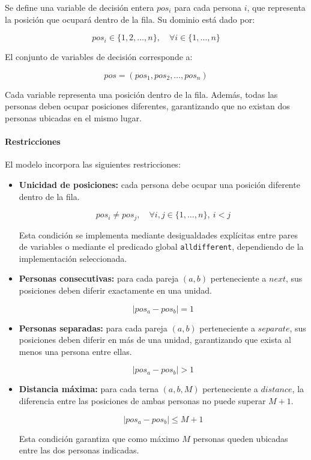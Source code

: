 Se define una variable de decisión entera $pos_i$ para cada persona $i$, que representa la posición que ocupará dentro de la fila. Su dominio está dado por:

\[
pos_i \in \{1,2,\ldots,n\},
\quad \forall i \in \{1,\ldots,n\}
\]

El conjunto de variables de decisión corresponde a:

\[
pos = (pos_1,pos_2,\ldots,pos_n)
\]

Cada variable representa una posición dentro de la fila. Además, todas las personas deben ocupar posiciones diferentes, garantizando que no existan dos personas ubicadas en el mismo lugar.

\paragraph{Restricciones}

El modelo incorpora las siguientes restricciones:

\begin{itemize}
    \item \textbf{Unicidad de posiciones:} cada persona debe ocupar una posición diferente dentro de la fila.

    \[
    pos_i \neq pos_j,
    \quad \forall i,j \in \{1,\ldots,n\},\ i<j
    \]

    Esta condición se implementa mediante desigualdades explícitas entre pares de variables o mediante el predicado global \texttt{alldifferent}, dependiendo de la implementación seleccionada.

    \item \textbf{Personas consecutivas:} para cada pareja $(a,b)$ perteneciente a $next$, sus posiciones deben diferir exactamente en una unidad.

    \[
    |pos_a-pos_b|=1
    \]

    \item \textbf{Personas separadas:} para cada pareja $(a,b)$ perteneciente a $separate$, sus posiciones deben diferir en más de una unidad, garantizando que exista al menos una persona entre ellas.

    \[
    |pos_a-pos_b|>1
    \]

    \item \textbf{Distancia máxima:} para cada terna $(a,b,M)$ perteneciente a $distance$, la diferencia entre las posiciones de ambas personas no puede superar $M+1$.

    \[
    |pos_a-pos_b|\leq M+1
    \]

    Esta condición garantiza que como máximo $M$ personas queden ubicadas entre las dos personas indicadas.
\end{itemize}

